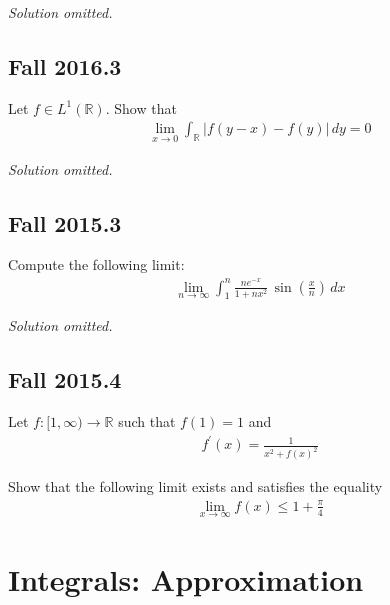 
\emph{Solution omitted.}

\hypertarget{fall-2016.3}{%
\subsection{Fall 2016.3}\label{fall-2016.3}}

Let \(f\in L^1({\mathbb{R}})\). Show that
\begin{align*}
\lim _{x \to 0} \int _{{\mathbb{R}}} {\left\lvert {f(y-x)-f(y)} \right\rvert} \, dy = 0
\end{align*}

\emph{Solution omitted.}

\hypertarget{fall-2015.3}{%
\subsection{Fall 2015.3}\label{fall-2015.3}}

\begin{problem}[?]

Compute the following limit:
\begin{align*}
\lim _{n \rightarrow \infty} \int_{1}^{n} \frac{n e^{-x}}{1+n x^{2}} \, \sin \left(\frac x n\right) \, dx
\end{align*}

\end{problem}

\emph{Solution omitted.}

\hypertarget{fall-2015.4}{%
\subsection{Fall 2015.4}\label{fall-2015.4}}

Let \(f: [1, \infty) \to {\mathbb{R}}\) such that \(f(1) = 1\) and
\begin{align*}
f^{\prime}(x)= \frac{1} {x^{2}+f(x)^{2}}
\end{align*}

Show that the following limit exists and satisfies the equality
\begin{align*}
\lim _{x \rightarrow \infty} f(x) \leq 1 + \frac \pi 4
\end{align*}

\hypertarget{integrals-approximation}{%
\section{Integrals: Approximation}\label{integrals-approximation}}

